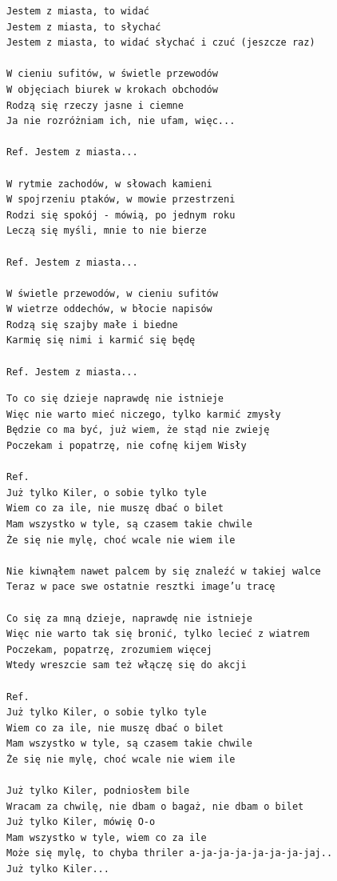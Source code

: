 \documentclass[12pt]{article}
\begin{document}
\begin{verbatim}
Jestem z miasta, to widać
Jestem z miasta, to słychać
Jestem z miasta, to widać słychać i czuć (jeszcze raz)

W cieniu sufitów, w świetle przewodów
W objęciach biurek w krokach obchodów
Rodzą się rzeczy jasne i ciemne
Ja nie rozróżniam ich, nie ufam, więc...

Ref. Jestem z miasta...

W rytmie zachodów, w słowach kamieni
W spojrzeniu ptaków, w mowie przestrzeni
Rodzi się spokój - mówią, po jednym roku
Leczą się myśli, mnie to nie bierze

Ref. Jestem z miasta...

W świetle przewodów, w cieniu sufitów
W wietrze oddechów, w błocie napisów
Rodzą się szajby małe i biedne
Karmię się nimi i karmić się będę

Ref. Jestem z miasta...
\end{verbatim}
\clearpage

\begin{verbatim}
To co się dzieje naprawdę nie istnieje
Więc nie warto mieć niczego, tylko karmić zmysły
Będzie co ma być, już wiem, że stąd nie zwieję
Poczekam i popatrzę, nie cofnę kijem Wisły

Ref.
Już tylko Kiler, o sobie tylko tyle
Wiem co za ile, nie muszę dbać o bilet
Mam wszystko w tyle, są czasem takie chwile
Że się nie mylę, choć wcale nie wiem ile

Nie kiwnąłem nawet palcem by się znaleźć w takiej walce
Teraz w pace swe ostatnie resztki image’u tracę

Co się za mną dzieje, naprawdę nie istnieje
Więc nie warto tak się bronić, tylko lecieć z wiatrem
Poczekam, popatrzę, zrozumiem więcej
Wtedy wreszcie sam też włączę się do akcji

Ref.
Już tylko Kiler, o sobie tylko tyle
Wiem co za ile, nie muszę dbać o bilet
Mam wszystko w tyle, są czasem takie chwile
Że się nie mylę, choć wcale nie wiem ile

Już tylko Kiler, podniosłem bile
Wracam za chwilę, nie dbam o bagaż, nie dbam o bilet
Już tylko Kiler, mówię O-o
Mam wszystko w tyle, wiem co za ile
Może się mylę, to chyba thriler a-ja-ja-ja-ja-ja-ja-jaj..
Już tylko Kiler...
\end{verbatim}
\clearpage
\end{document}
